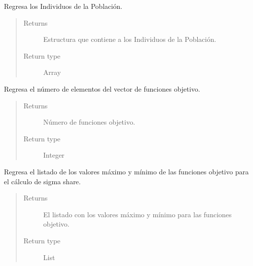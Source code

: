 \documentclass[class=report, crop=false]{standalone}
\begin{document}
\begin{fulllineitems}
\begin{fulllineitems}
Regresa los Individuos de la Población.

\begin{quote}\begin{description}
\item[{Returns}] \leavevmode
Estructura que contiene a los Individuos de la Población.
\item[{Return type}] \leavevmode
Array
\end{description}\end{quote}

\end{fulllineitems}

\begin{fulllineitems}

Regresa el número de elementos del vector de funciones 
objetivo.
\begin{quote}\begin{description}
\item[{Returns}] \leavevmode
Número de funciones objetivo.
\item[{Return type}] \leavevmode
Integer
\end{description}\end{quote}

\end{fulllineitems}

\begin{fulllineitems}

Regresa el listado de los valores máximo y mínimo de las 
funciones objetivo para el cálculo de sigma share.

\begin{quote}\begin{description}
\item[{Returns}] \leavevmode
El listado con los valores máximo y mínimo para las
funciones objetivo.
\item[{Return type}] \leavevmode
List
\end{description}\end{quote}

\end{fulllineitems}

\begin{fulllineitems}


\end{fulllineitems}
\end{fulllineitems}
\end{document}
